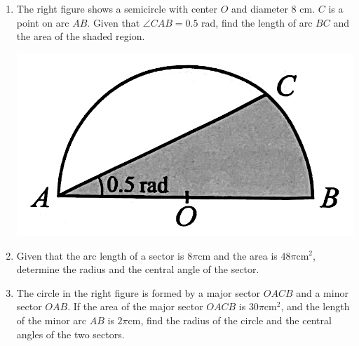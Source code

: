 \documentclass{report}
\begin{document}
\begin{enumerate}
    \item \begin{multicols}{2}
        The right figure shows a semicircle with center $O$ and diameter $8$ cm. $C$ is a point on arc $AB$. Given that $\angle CAB=0.5$ rad, find the length of arc $BC$ and the area of the shaded region.

        \begin{center}
            \includegraphics[scale=0.14]{assets/8-17.png}
        \end{center}
    \end{multicols}

    \item Given that the arc length of a sector is $8 \pi \mathrm{cm}$ and the area is $48 \pi \mathrm{cm}^2$, determine the radius and the central angle of the sector.

    \item \begin{multicols}{2}
        The circle in the right figure is formed by a major sector $OACB$ and a minor sector $OAB$. If the area of the major sector $OACB$ is $30 \pi \mathrm{cm}^2$, and the length of the minor arc $AB$ is $2 \pi \mathrm{cm}$, find the radius of the circle and the central angles of the two sectors.


\end{multicols}
\end{enumerate}
\end{document}
